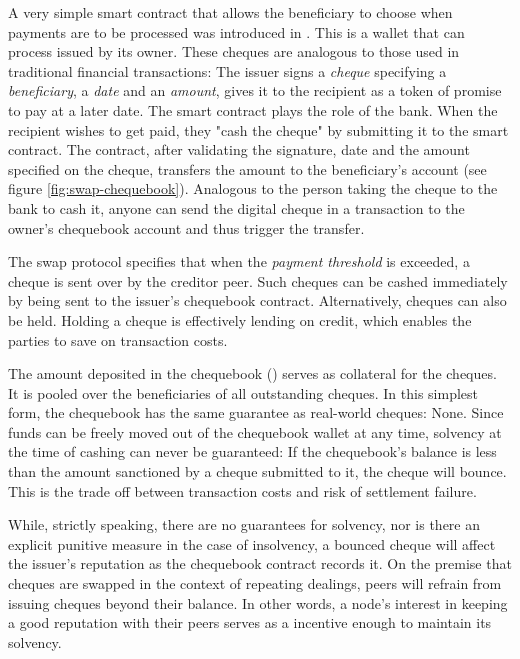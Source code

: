 A very simple smart contract that allows the beneficiary to choose when payments are to be processed was introduced in \cite{ethersphere2016sw3}. This  is a wallet that can process  issued by its owner. These cheques are analogous to those used in traditional financial transactions: The issuer signs a \emph{cheque} specifying a \emph{beneficiary}, a \emph{date} and an \emph{amount}, gives it to the recipient as a token of promise to pay at a later date. The smart contract plays the role of the bank. When the recipient wishes to get paid, they "cash the cheque" by submitting it to the smart contract. The contract, after validating the signature, date and the amount specified on the cheque, transfers the amount to the beneficiary's account (see figure \ref{fig:swap-chequebook}). Analogous to the person taking the cheque to the bank to cash it, anyone can send the digital cheque in a transaction to the owner's chequebook account and thus trigger the transfer. 

The swap protocol specifies that when the \emph{payment threshold} is exceeded, a cheque is sent over by the creditor peer. Such cheques can be cashed immediately by being sent to the issuer's chequebook contract. Alternatively, cheques can also be held. Holding a cheque is effectively lending on credit, which enables the parties to save on transaction costs. 

The amount deposited in the chequebook () serves as collateral for the cheques. It is pooled over the beneficiaries of all outstanding cheques. In this simplest form, the chequebook has the same guarantee as real-world cheques: None. Since funds can be freely moved out of the chequebook wallet at any time, solvency at the time of cashing can never be guaranteed: If the chequebook's balance is less than the amount sanctioned by a cheque submitted to it, the cheque will bounce. This is the trade off between transaction costs and risk of settlement failure.

While, strictly speaking, there are no guarantees for solvency, nor is there an explicit punitive measure in the case of insolvency, a bounced cheque will affect the issuer's reputation as the chequebook contract records it. On the premise that cheques are swapped in the context of repeating dealings, peers will refrain from issuing cheques beyond their balance. In other words, a node's interest in keeping a good reputation with their peers serves as a incentive enough to maintain its solvency.



